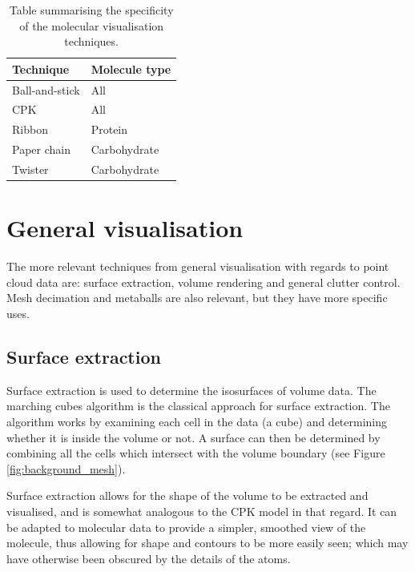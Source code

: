 \begin{table}[h!]
  \begin{tabular}{ | l | l | }
  \hline
  Technique      & Molecule type  \\ \hline
  Ball-and-stick & All            \\ \hline
  CPK            & All            \\ \hline
  Ribbon         & Protein        \\ \hline
  Paper chain    & Carbohydrate   \\ \hline
  Twister        & Carbohydrate   \\ \hline
  \end{tabular}
  \caption{Table summarising the specificity of the molecular visualisation
  techniques.}
  \label{tab:background_molecular}
\end{table}


\section{General visualisation}
\label{sec:background_general}


The more relevant techniques from general visualisation with regards to point
cloud data are: surface extraction, volume rendering and general clutter
control. Mesh decimation and metaballs are also relevant, but they have more
specific uses.


\subsection{Surface extraction}
\label{sub:background_surface}


Surface extraction is used to determine the isosurfaces of volume data. The
marching cubes algorithm \citep{lorensen87} is the classical approach for
surface extraction. The algorithm works by examining each cell in the data (a
cube) and determining whether it is inside the volume or not. A surface can
then be determined by combining all the cells which intersect with the volume
boundary (see Figure \ref{fig:background_mesh}).

Surface extraction allows for the shape of the volume to be extracted and
visualised, and is somewhat analogous to the CPK model in that regard. It can
be adapted to molecular data to provide a simpler, smoothed view of the
molecule, thus allowing for shape and contours to be more easily seen; which
may have otherwise been obscured by the details of the atoms.

